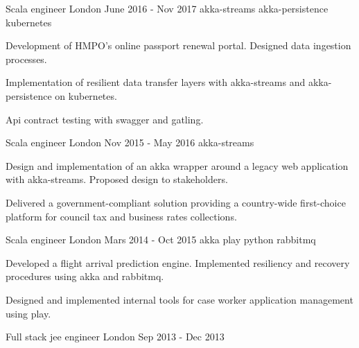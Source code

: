 \begin{cventries}
    \cventry
    {Scala engineer}
    {} %
    {London} %
    {June 2016 - Nov 2017} %
    {akka-streams {} akka-persistence {} kubernetes}
    {
        \begin{cvitems}
            \item{Development of HMPO's online passport renewal portal. Designed data ingestion processes.}
            \item{Implementation of resilient data transfer layers with akka-streams and akka-persistence on kubernetes.}
            \item{Api contract testing with swagger and gatling.}
        \end{cvitems}
    }

    \cventry
    {Scala engineer}
    {} %
    {London} %
    {Nov 2015 - May 2016} %
    {akka-streams}
    {
        \begin{cvitems}
            \item{Design and implementation of an akka wrapper around a legacy web application with akka-streams. Proposed design to stakeholders.}
            \item{Delivered a government-compliant solution providing a country-wide first-choice platform for council tax and business rates collections.}
        \end{cvitems}
    }

    \cventry
    {Scala engineer}
    {} %
    {London} %
    {Mars 2014 - Oct 2015} %
    {akka {} play {} python {} rabbitmq}
    {
        \begin{cvitems}
            \item{Developed a flight arrival prediction engine. Implemented resiliency and recovery procedures using akka and rabbitmq.}
            \item{Designed and implemented internal tools for case worker application management using play.}
        \end{cvitems}
    }

    \cventry
    {Full stack jee engineer}
    {} %
    {London} %
    {Sep 2013 - Dec 2013} %
    {}
    {}


\end{cventries}
